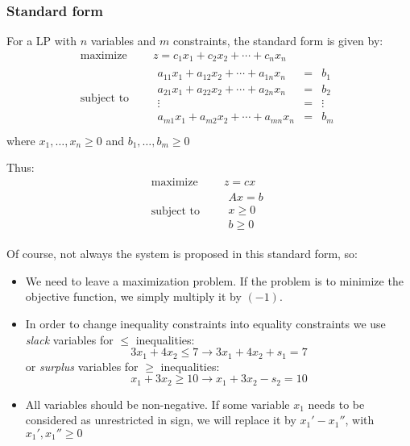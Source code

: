 \subsubsection{Standard form}

    For a LP with $n$ variables and $m$ constraints, the standard form is given by:
    \begin{equation*}
      \begin{aligned}
        \text{maximize } \quad & z = c_1x_1+c_2x_2 +\cdots + c_nx_n \\
        \text{subject to }\quad &
        \begin{array}{rcl}
          a_{11}x_1+a_{12}x_2+\cdots+a_{1n}x_n &= &b_1 \\
          a_{21}x_1+a_{22}x_2+\cdots+a_{2n}x_n &= &b_2 \\
          \vdots &=& \vdots\\
          a_{m1}x_1+a_{m2}x_2+\cdots+a_{mn}x_n &= &b_m \\
        \end{array}
      \end{aligned}
    \end{equation*}
    where $x_1,\ldots,x_n\geq0$ and $b_1,\ldots,b_m\geq0$

Thus:
\begin{equation*}
  \begin{aligned}
    \text{maximize } \quad & z = cx \\
    \text{subject to }\quad &
    \begin{array}{c}
      Ax=b\\
      x\geq0\\
      b\geq0
    \end{array}
  \end{aligned}
\end{equation*}


Of course, not always the system is proposed in this standard form, so\cite{carter_operations_2019}:
\begin{itemize}
  \item We need to leave a maximization problem. If the problem is to minimize the objective function, we simply multiply it by $(-1)$.
  \item In order to change inequality constraints into equality constraints we use {\it slack} variables for $\leq$ inequalities:
  \[
  3x_1+4x_2 \leq 7  \rightarrow  3x_1+4x_2+s_1 =7
  \]
  or {\it surplus} variables for $\geq$ inequalities:
  \[
  x_1+3x_2\geq 10 \rightarrow x_1+3x_2 -s_2 =10
  \]
  \item All variables should be non-negative. If some variable $x_1$ needs to be considered as unrestricted in sign, we will replace it by $x_1'-x_1''$, with $x_1',x_1''\geq 0$
\end{itemize}

